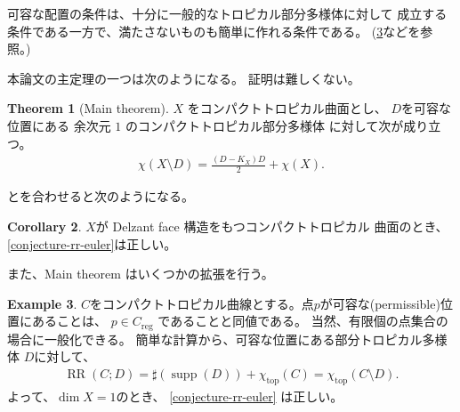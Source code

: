 \documentclass[a4paper,dvipdfmx,reqno,12pt]{amsart}
\theoremstyle{definition}
\newtheorem{theorem}{Theorem}[section]
\newtheorem{example}[theorem]{Example}
\newtheorem{corollary}[theorem]{Corollary}
\newcommand{\opn}[1]{\operatorname{#1}}
\numberwithin{equation}{section}
\begin{document}
可容な配置の条件は、十分に一般的なトロピカル部分多様体に対して
成立する条件である一方で、満たさないものも簡単に作れる条件である。
(\cref{example-permissible-point}などを参照。)

本論文の主定理の一つは次のようになる。
証明は難しくない。
\begin{theorem}[{Main theorem}]
\label{theorem-rr-euler-surface}
$X$ をコンパクトトロピカル曲面とし、
$D$を可容な位置にある
余次元 $1$ のコンパクトトロピカル部分多様体
に対して次が成り立つ。
\begin{align}
\chi(X\setminus D)=\frac{(D-K_X)D}{2}+
\chi(X).
\end{align}
\end{theorem}
\cite[Theorem 6.3]{demedrano2023chern}
とを合わせると次のようになる。
\begin{corollary}
$X$が Delzant face 構造をもつコンパクトトロピカル
曲面のとき、 \cref{conjecture-rr-euler}は正しい。
\end{corollary}

また、Main theorem はいくつかの拡張を行う。

\begin{example}
\label{example-permissible-point}
$C$をコンパクトトロピカル曲線とする。点$p$が可容な(permissible)位置にあることは、
$p\in C_{\opn{reg}}$ であることと同値である。
当然、有限個の点集合の場合に一般化できる。
簡単な計算から、可容な位置にある部分トロピカル多様体
$D$に対して、
\begin{align}
\opn{RR}(C;D)=\sharp (\opn{supp}(D))+ \chi_{\opn{top}}(C)
=\chi_{\opn{top}}(C\setminus D).
\end{align}
よって、$\dim X=1$のとき、
\cref{conjecture-rr-euler}
は正しい。
\end{example}
\end{document}
